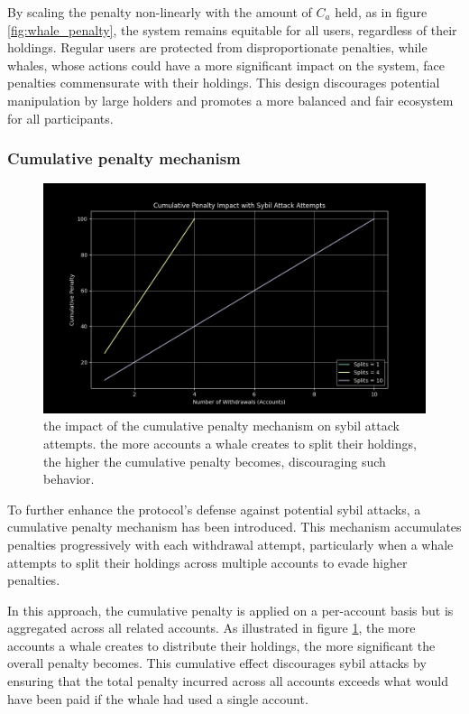 \documentclass{article}
\begin{document}
By scaling the penalty non-linearly with the amount of $C_a$ held, as in figure \ref{fig:whale_penalty}, the system remains equitable for all users, regardless of their holdings. Regular users are protected from disproportionate penalties, while whales, whose actions could have a more significant impact on the system, face penalties commensurate with their holdings. This design discourages potential manipulation by large holders and promotes a more balanced and fair ecosystem for all participants.

\subsubsection{Cumulative penalty mechanism}

\begin{figure}[h]
\centering
\includegraphics[width=\textwidth]{images/9.png}
\caption{the impact of the cumulative penalty mechanism on sybil attack attempts. the more accounts a whale creates to split their holdings, the higher the cumulative penalty becomes, discouraging such behavior.}
\label{fig:cumulative_penalty}
\end{figure}


To further enhance the protocol's defense against potential sybil attacks, a cumulative penalty mechanism has been introduced. This mechanism accumulates penalties progressively with each withdrawal attempt, particularly when a whale attempts to split their holdings across multiple accounts to evade higher penalties.

In this approach, the cumulative penalty is applied on a per-account basis but is aggregated across all related accounts. As illustrated in figure \ref{fig:cumulative_penalty}, the more accounts a whale creates to distribute their holdings, the more significant the overall penalty becomes. This cumulative effect discourages sybil attacks by ensuring that the total penalty incurred across all accounts exceeds what would have been paid if the whale had used a single account.
\end{document}
